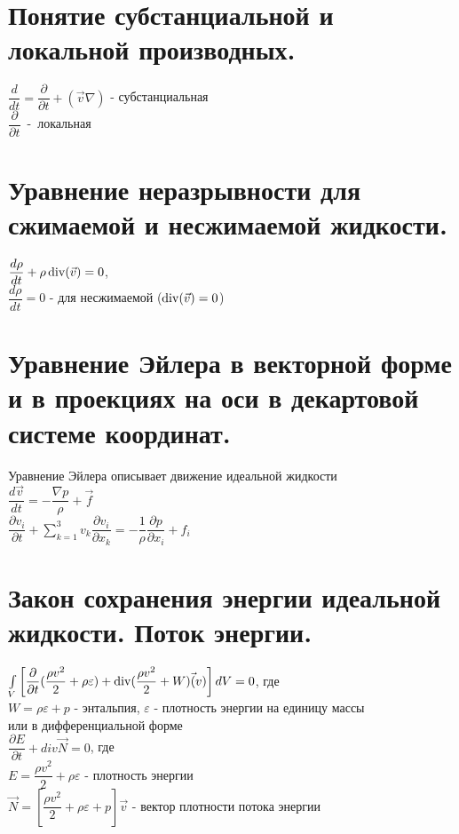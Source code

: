 


\newcommand{\sumk}{\sum\limits_{k=1}^3}


	\small
	\begin{multicols*}{2}
		\section{Понятие субстанциальной и локальной производных.}
		$\dfrac{d}{dt}=\dfrac{\partial}{\partial t}+(\vec{v}\nabla)$ - субстанциальная \\
		$\dfrac{\partial}{\partial t}$~-~локальная
		
		\section{Уравнение неразрывности для сжимаемой и несжимаемой жидкости.}
		$\dfrac{d\rho}{dt}+\rho \operatorname{div}(\vec{v})=0$, \\
		$\dfrac{d\rho}{dt}=0$ -  для несжимаемой ($\operatorname{div}(\vec{v})=0$)
		
		\section{Уравнение Эйлера в векторной форме и в проекциях на оси в декартовой системе координат.}
		Уравнение Эйлера описывает движение идеальной жидкости\\
		$\dfrac{d\vec{v}}{dt}=-\dfrac{\nabla p}{\rho}+\vec{f}$ \\
		$\dfrac{\partial v_i}{\partial t}+\sumk v_k\dfrac{\partial v_i}{\partial x_k}=-\dfrac{1}{\rho}\dfrac{\partial p}{\partial x_i}+f_i$
		
		\section{Закон сохранения энергии идеальной жидкости. Поток энергии.}
		$\int\limits_V\left[\dfrac{\partial}{\partial t}(\dfrac{\rho v^2}{2}+\rho\varepsilon)+\operatorname{div}(\dfrac{\rho v^2}{2}+W)\vec(v)\right]dV=0$, где\\
		$W=\rho\varepsilon+p$ - энтальпия, $\varepsilon$ - плотность энергии на единицу массы \\
		или в дифференциальной форме \\
		$\dfrac{\partial E}{\partial t}+div\vec{N}=0$, где \\
		$E=\dfrac{\rho v^2}{2}+\rho\varepsilon$ - плотность энергии \\
		$\vec{N}=\left[\dfrac{\rho v^2}{2}+\rho\varepsilon+p\right]\vec{v}$ - вектор плотности потока энергии
		

\end{multicols*}
